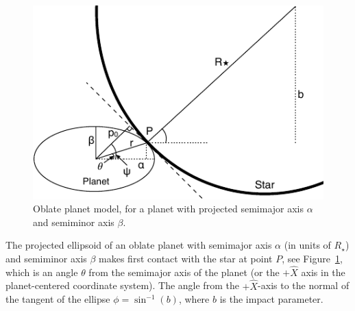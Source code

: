 \begin{figure}
    \centering
    \includegraphics[scale=1.5]{robin/oblate.pdf}
    \caption{Oblate planet model, for a planet with projected semimajor axis $\alpha$ and semiminor axis $\beta$.}
    \label{fig:oblate}
\end{figure}

The projected ellipsoid of an oblate planet with semimajor axis $\alpha$ (in units of $R_\star$) and semiminor axis $\beta$ makes first contact with the star at point $P$, see Figure~\ref{fig:oblate}, which is an angle $\theta$ from the semimajor axis of the planet (or the $+\hat{X}$ axis in the planet-centered coordinate system). The angle from the $+\hat{X}$-axis to the normal of the tangent of the ellipse $\phi = \sin^{-1}(b)$, where $b$ is the impact parameter. 

